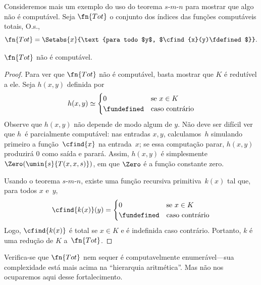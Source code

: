 \documentclass[../../../include/open-logic-section]{subfiles}
\begin{document}

Consideremos mais um exemplo do uso do teorema $s$-$m$-$n$ para
mostrar que algo não é computável. Seja $\fn{Tot}$ o conjunto dos
índices das funções computáveis totais, O.s.\@,
\[
\fn{Tot} = \Setabs{x}{\text{para todo $y$, $\cfind{x}(y)\fdefined$}}.
\]

\begin{prop}
$\fn{Tot}$ não é computável.
\end{prop}

\begin{proof}
Para ver que $\fn{Tot}$ não é computável, basta mostrar que $K$ é
redutível a ele. Seja $h(x,y)$ definida por
\[
h(x,y) \simeq
\begin{cases}
0 & \text{se $x \in K$} \\
\fundefined & \text{caso contrário}
\end{cases}
\]
Observe que $h(x,y)$ não depende de modo algum de $y$. Não deve ser
difícil ver que $h$~é parcialmente computável: nas entradas $x, y$,
calculamos~$h$ simulando primeiro a função~$\cfind{x}$ na entrada~$x$;
se essa computação parar, $h(x,y)$ produzirá $0$ como saída e parará.
Assim, $h(x,y)$ é simplesmente $\Zero(\umin{s}{T(x,x,s)})$, em que
$\Zero$ é a função constante zero.

Usando o teorema $s$-$m$-$n$, existe uma função recursiva
primitiva~$k(x)$ tal que, para todos $x$ e~$y$,
\[
\cfind{k(x)}(y) =
\begin{cases}
0 & \text{se $x \in K$} \\
\fundefined & \text{caso contrário}
\end{cases}
\]
Logo, $\cfind{k(x)}$ é total se $x \in K$ e é indefinida caso
contrário. Portanto, $k$ é uma redução de $K$ a~$\fn{Tot}$.
\end{proof}

\begin{digress}
Verifica-se que $\fn{Tot}$ nem sequer é computavelmente enumerável---sua
complexidade está mais acima na ``hierarquia aritmética''. Mas não
nos ocuparemos aqui desse fortalecimento.
\end{digress}
\end{document}

